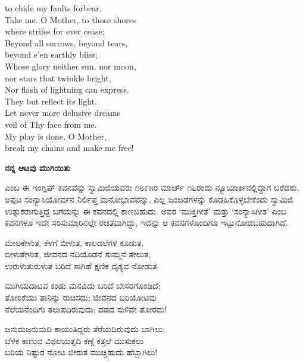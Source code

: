 \begin{myquote}
{to chide my faults forbear.\\
Take me. O Mother, to those shores\\
where strifes for ever cease;\\
Beyond all sorrows, beyond tears,\\
beyond e’en earthly bliss;\\
Whose glory neither sun, nor moon,\\
nor stars that twinkle bright,\\
Nor flash of lightning can express.\\
They but reflect its light.\\
Let never more delusive dreams\\
veil of Thy face from me.\\
My play is done, O Mother,\\
break my chains and make me free!}
\end{myquote}

\selectkan

\begin{center}
\textbf{ನನ್ನ ಆಟವು ಮುಗಿಯಿತು}
\end{center}

 ಎಂಬ ಈ ಇಂಗ್ಲಿಷ್ ಕವನವನ್ನು ಸ್ವಾಮಿಜಿಯವರು ೧೮೯೫ರ ಮಾರ್ಚ್ ೧೬ರಂದು ನ್ಯೂಯಾರ್ಕಿನಲ್ಲಿದ್ದಾಗ ಬರೆದರು. ಅಪ್ಪಟ ಸಂನ್ಯಾಸಿಯೋರ್ವನ ನಿರ್ಲಿಪ್ತ ಮನೋಭಾವವನ್ನು, ಎಲ್ಲ ಜಂಜಡಗಳನ್ನು ಕೊಡಹಿಕೊಳ್ಳಬೇಕೆಂದು ಸ್ವಾಮಿಜಿ ಉತ್ಸುಕರಾಗುತ್ತಿದ್ದ ಬಗೆಯನ್ನು ಈ ಕವನದಲ್ಲಿ ಕಾಣಬಹುದು. ಅವರ ‘ಮುಕ್ತಿಗೀತೆ’ ಮತ್ತು ‘ಸಂನ್ಯಾಸಿಗೀತ’ ಎಂಬ ಕವನಗಳೂ ಇದೇ ಸರಿಸುಮಾರಿನಲ್ಲೇ ರಚಿತವಾಗಿದ್ದು, ಇದನ್ನು ಆ ಕವನಗಳೊಂದಿಗೂ ಇಟ್ಟುನೋಡಬಹುದಾಗಿದೆ.

\begin{myquote}
ಮೇಲಕೇಳುತ, ಕೆಳಗೆ ಬೀಳುತ, ಕಾಲದಲೆಗಳ ಕೂಡುತ,\\ಬೀಳುತೇಳುತ, ಜೀವನದ ನದಿಯೊಡನೆ ಸುಮ್ಮನೆ ತೇಲುತ,\\ಉರುಳುತುರುಳುತ ಬರಿದೆ ಸಾಗಿಹೆ ಕ್ಷಣಿಕ ದೃಶ್ಯವ ನೋಡುತ-
\end{myquote}

\begin{myquote}
ಮುಗಿಯದಾಟವ ಕಂಡು ಮನವಿದು ಬರಿದೆ ಬೇಸರಗೊಂಡಿದೆ;\\ತೋರಿಕೆಯು ತಾನಿನ್ನು ರುಚಿಸದು; ಜೀವನದ ಬರಿಯೋಟವು\\ನೆಲೆಯನೆಂದಿಗು ತಲುಪದಿರುವುದು; ದಡದ ಸುಳಿವೇ ತೋರದು!
\end{myquote}

\begin{myquote}
ಜನುಮಜನುಮದಿ ಕಾಯುತಿದ್ದರು ತೆರೆಯದಿರುವುದು ಬಾಗಿಲು;\\ಬೆಳಕ ಕಾಣುವ ವಿಫಲಯತ್ನದಿ ಕಣ್ಗೆ ಕತ್ತಲೆ ಮುಸುಕಲು\\ಬರಿಯ ನಿಷ್ಟುರ ನೋಟ ಬೀರುತ ಮುಚ್ಚಿಹುದು ಹೆಬ್ಬಾಗಿಲು!
\end{myquote}

